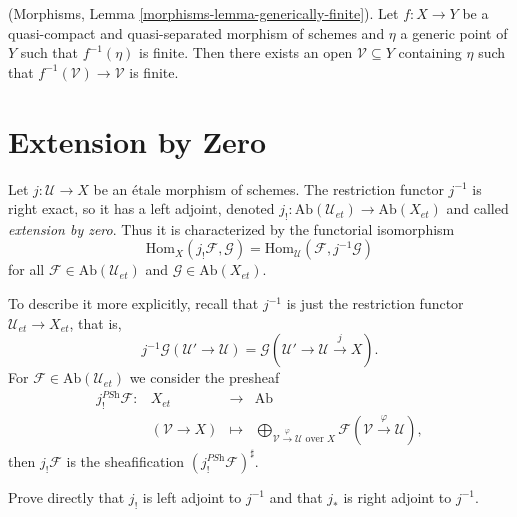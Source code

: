 \begin{lemma}
\label{lemma-generically-finite}
(Morphisms, Lemma \ref{morphisms-lemma-generically-finite}).
Let $f: X\to Y$ be a quasi-compact and quasi-separated morphism of schemes and
$\eta$ a generic point of $Y$ such that $f^{-1}(\eta)$ is finite. Then there
exists an open $\mathcal{V} \subseteq Y$ containing $\eta$ such that
$f^{-1}(\mathcal{V})\to \mathcal{V}$ is finite.
\end{lemma}






\section{Extension by Zero}
\label{section-extension-by-zero}

\begin{definition}
\label{definition-extension-zero}
Let $j: \mathcal{U} \to X$ be an \'etale morphism of schemes. The restriction
functor $j^{-1}$ is right exact, so it has a left adjoint, denoted
$j_! : \text{Ab}(\mathcal{U}_{et})\to \text{Ab}(X_{et})$
and called {\it extension by zero}.
Thus it is characterized by the functorial isomorphism
$$
\text{Hom}_X(j_!\mathcal{F}, \mathcal{G}) =
\text{Hom}_\mathcal{U}(\mathcal{F}, j^{-1}\mathcal{G})
$$
for all $\mathcal{F} \in \text{Ab}(\mathcal{U}_{et})$ and
$\mathcal{G} \in \text{Ab}(X_{et})$.
\end{definition}

\noindent
To describe it more explicitly, recall that $j^{-1}$ is just the restriction
functor $\mathcal{U}_{et}\to X_{et}$, that is,
$$
j^{-1}\mathcal{G}(\mathcal{U}'\to \mathcal{U}) = \mathcal{G}
\left(\mathcal{U}'\to \mathcal{U} \xrightarrow{j} X\right).
$$
For $\mathcal{F} \in \text{Ab}(\mathcal{U}_{et})$ we consider the presheaf
$$
\begin{matrix}
j_!^{\textit{PSh}}\mathcal{F}: & X_{et} &\longrightarrow & \text{Ab}\\
& (\mathcal{V}\to X) & \longmapsto & \displaystyle
\bigoplus_{\mathcal{V}\xrightarrow{\varphi} \mathcal{U}\text{ over }X}
\mathcal{F}(\mathcal{V}\xrightarrow{\varphi}\mathcal{U}),
\end{matrix}
$$
then $j_!\mathcal{F}$ is the sheafification
$\left(j_!^{\textit{PSh}}\mathcal{F}\right)^\sharp$.

\begin{exercise}
\label{exercise-jshriek-direct}
Prove directly that $j_!$ is left adjoint to $j^{-1}$ and that $j_*$ is right
adjoint to $j^{-1}$.
\end{exercise}

